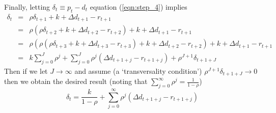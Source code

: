 \documentclass[authoryear,11pt]{elsarticle}
\begin{document}
Finally, letting $\delta_{t} \equiv p_{t} - d_{t}$ equation (\ref{eqn:step_4}) implies
\begin{eqnarray*}
\delta_{t} 	&=& 	\rho \delta_{t+1} + k + \Delta d_{t+1} - r_{t+1}	\\
			&=&	\rho (\rho \delta_{t+2} + k + \Delta d_{t+2} - r_{t+2}) + k + \Delta d_{t+1} - r_{t+1} \\
			&=&	\rho (\rho (\rho \delta_{t+3} + k + \Delta d_{t+3} - r_{t+3}) + k + \Delta d_{t+2} - r_{t+2}) + k + \Delta d_{t+1} - r_{t+1} \\
			&=&	k \sum\limits_{j=0}^{J} \rho^{j} + \sum\limits_{j=0}^{J} \rho^{j}( \Delta d_{t+1+j} - r_{t+1+j} ) + \rho^{J+1} \delta_{t+1+J}
\end{eqnarray*}
Then if we let $J\to \infty$ and assume (a `transversality condition') $\rho^{J+1} \delta_{t+1+J} \to 0$ then we obtain the desired result (noting that $ \sum\limits_{j=0}^{\infty} \rho^{j} = \frac{1}{1-\rho}$)
\[
\delta_{t} = \frac{k}{1-\rho} + \sum\limits_{j=0}^{\infty} \rho^{j}(\Delta d_{t+1+j} - r_{t+1+j})
\]
\end{document}

